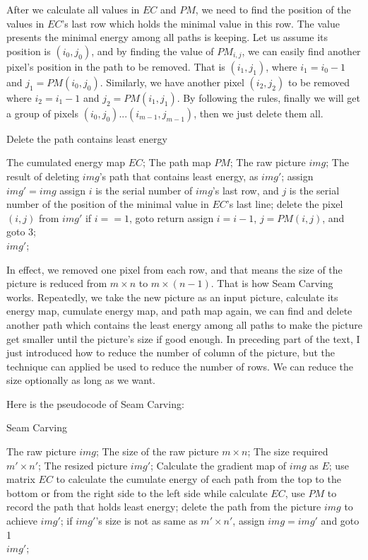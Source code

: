 \documentclass[final]{cvpr}
\begin{document}
After we calculate all values in $EC$ and $PM$, we need to find the position of the values in $EC$'s last row which holds the minimal value in this row. The value presents the minimal energy among all paths is keeping. Let us assume its position is $(i_0,j_0)$, and by finding the value of $PM_{i,j}$, we can easily find another pixel's position in the path to be removed. That is $(i_1, j_1)$, where $i_1 = i_0 - 1$ and $j_1=PM(i_0,j_0)$. Similarly, we have another pixel $(i_2,j_2)$ to be removed where $i_2 = i_1 - 1$ and $j_2 = PM(i_1,j_1)$. By following the rules, finally we will get a group of pixels $(i_0,j_0)$...$(i_{m-1},j_{m-1})$, then we just delete them all.
\begin{algorithm}[htb]  
  \caption{Delete the path contains least energy}  
  \begin{algorithmic}[1]  
    \Require
    The cumulated energy map $EC$; 
    The path map $PM$;
    The raw picture $img$;  
    \Ensure  
    The result of deleting $img$'s path that contains least energy, as $img'$;
    \State assign $img' = img$
    \State assign $i$ is the serial number of $img$'s last row, and $j$ is the serial number of the position of the minimal value in $EC$'s last line;  
    \State delete the pixel $(i,j)$ from $img'$ 
    \State if $i==1$, goto return
    \State assign $i=i-1$, $j=PM(i,j)$, and goto 3;\\  
    \Return $img'$;  
  \end{algorithmic}  
\end{algorithm}

In effect, we removed one pixel from each row, and that means the size of the picture is reduced from $m\times n$ to $m\times(n-1)$. That is how Seam Carving works. Repeatedly, we take the new picture as an input picture, calculate its energy map, cumulate energy map, and path map again, we can find and delete another path which contains the least energy among all paths to make the picture get smaller until the picture's size if good enough. In preceding part of the text, I just introduced how to reduce the number of column of the picture, but the technique can applied be used to reduce the number of rows. We can reduce the size optionally as long as we want.

Here is the pseudocode of Seam Carving:
\begin{algorithm}[htb]  
  \caption{Seam Carving}  
  \begin{algorithmic}[1]  
    \Require
    The raw picture $img$; 
    The size of the raw picture $m\times n$;
    The size required $m'\times n'$;  
    \Ensure  
    The resized picture $img'$;  
    \State Calculate the gradient map of $img$ as $E$;  
    \State use matrix $EC$ to calculate the cumulate energy of each path from the top to the bottom or from the right side to the left side
    \State while calculate $EC$, use $PM$ to record the path that holds least energy;  
    \State delete the path from the picture $img$ to achieve $img'$;  
    \State if $img'$'s size is not as same as $m'\times n'$, assign $img = img'$ and goto 1\\  
    \Return $img'$;  
  \end{algorithmic}  
\end{algorithm}
\end{document}
